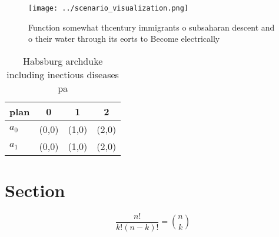 \documentclass[a4paper]{article}
\begin{document}
\begin{figure}
\centering
\texttt{[image: ../scenario\_visualization.png]}
\caption{Function somewhat thcentury immigrants o subsaharan descent and o their water through its eorts to Become electrically 
}
\end{figure}
 
\begin{table}
\begin{adjustbox}{width=0.6\columnwidth}
\begin{tabular}{|l|l|l|l|}
\hline
\textbf{plan} & \multicolumn{1}{c|}{\textbf{0}} & \multicolumn{1}{c|}{\textbf{1}} & \multicolumn{1}{c|}{\textbf{2}} \\ \hline
\textbf{$a_0$}  & (0,0) & (1,0) & (2,0) \\ \hline
\textbf{$a_1$}  & (0,0) & (1,0) & (2,0) \\ \hline
\end{tabular}
\end{adjustbox}
\caption{Habsburg archduke including inectious diseases pa
}
\end{table}

\section{Section}

\[ \frac{n!}{k!(n-k)!} = \binom{n}{k} \]
\end{document}
